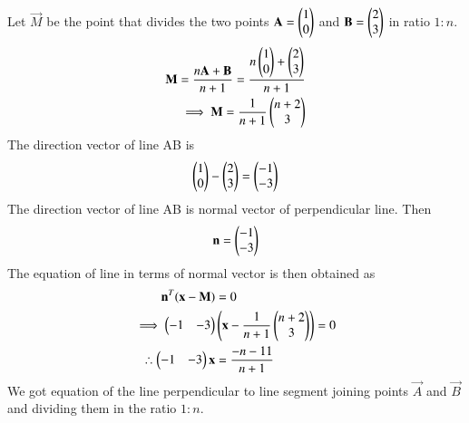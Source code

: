 Let $\vec{M}$ be the point that divides the two points $\mathbf{A}=\begin{pmatrix}1\\0\end{pmatrix}$ and $\mathbf{B}=\begin{pmatrix}2\\3\end{pmatrix}$ in ratio $1:n.$
\begin{align}
    \mathbf{M}=\frac{n\mathbf{A}+\mathbf{B}}{n+1}=\frac{n\begin{pmatrix}1\\0\end{pmatrix}+\begin{pmatrix}2\\3\end{pmatrix}}{n+1}\\
    \implies\mathbf{M}=\frac{1}{n+1}\begin{pmatrix}n+2\\3\end{pmatrix}\nonumber
\end{align}
The direction vector of line AB is
\begin{align}
    \begin{pmatrix}1\\0\end{pmatrix}-\begin{pmatrix}2\\3\end{pmatrix}=\begin{pmatrix}-1\\-3\end{pmatrix}
\end{align}
The direction vector of line AB is normal vector of perpendicular line. Then
\begin{align}
    \mathbf{n}=\begin{pmatrix}-1\\-3\end{pmatrix}
\end{align}
The equation of line in terms of normal vector is then obtained as
\begin{align}
    \mathbf{n}^T(\mathbf{x}-\mathbf{M})&=0\\
    \implies\begin{pmatrix}-1&-3\end{pmatrix}&\left(\mathbf{x}-\frac{1}{n+1}\begin{pmatrix}n+2\\3\end{pmatrix}\right) = 0\\
    \therefore \begin{pmatrix}-1&-3\end{pmatrix}\mathbf{x}&= \frac{-n-11}{n+1}
\end{align}
We got equation of the line perpendicular to line segment joining points $\vec{A}$ and $\vec{B}$ and dividing them in the ratio $1:n$. 

